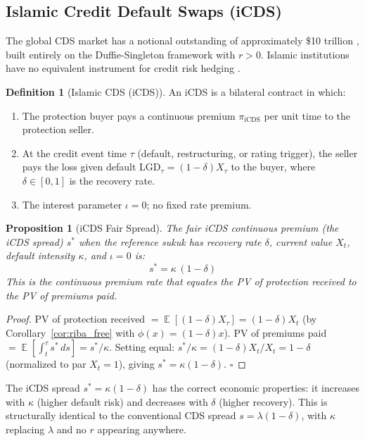 \documentclass[10pt,twocolumn]{article}
\theoremstyle{plain}
\newtheorem{proposition}{Proposition}
\theoremstyle{definition}
\newtheorem{definition}{Definition}
\DeclareMathOperator{\E}{\mathbb{E}}
\begin{document}
\subsection{Islamic Credit Default Swaps (iCDS)}
\label{sec:icds}

The global CDS market has a notional outstanding of approximately
\$10 trillion \cite{BIS2024}, built entirely on the Duffie-Singleton
framework with $r > 0$. Islamic institutions have no equivalent
instrument for credit risk hedging \cite{KhanAhmed2001}.

\begin{definition}[Islamic CDS (iCDS)]
An iCDS is a bilateral contract in which:
\begin{enumerate}[leftmargin=*,noitemsep]
\item The protection buyer pays a continuous premium $\pi_{\mathrm{iCDS}}$
per unit time to the protection seller.
\item At the credit event time $\tau$ (default, restructuring,
or rating trigger), the seller pays the loss given default
$\mathrm{LGD}_\tau = (1-\delta) X_\tau$ to the buyer, where
$\delta \in [0,1]$ is the recovery rate.
\item The interest parameter $\iota = 0$; no fixed rate premium.
\end{enumerate}
\end{definition}

\begin{proposition}[iCDS Fair Spread]
\label{prop:icds}
The fair iCDS continuous premium (the \emph{iCDS spread}) $s^*$
when the reference sukuk has recovery rate $\delta$, current
value $X_t$, default intensity $\kappa$, and $\iota = 0$ is:
\begin{equation}
s^* = \kappa\,(1-\delta)
\label{eq:icds_spread}
\end{equation}
This is the continuous premium rate that equates the PV of
protection received to the PV of premiums paid.
\end{proposition}

\begin{proof}
PV of protection received $= \E[(1-\delta)X_\tau] = (1-\delta)X_t$
(by Corollary~\ref{cor:riba_free} with $\phi(x) = (1-\delta)x$).
PV of premiums paid $= \E[\int_t^\tau s^*\,ds] = s^*/\kappa$.
Setting equal: $s^*/\kappa = (1-\delta)X_t/X_t = 1-\delta$
(normalized to par $X_t=1$), giving $s^* = \kappa(1-\delta)$.
\qquad$\square$
\end{proof}

The iCDS spread $s^* = \kappa(1-\delta)$ has the correct
economic properties: it increases with $\kappa$ (higher default
risk) and decreases with $\delta$ (higher recovery). This
is structurally identical to the conventional CDS spread
$s = \lambda(1-\delta)$, with $\kappa$ replacing $\lambda$
and no $r$ appearing anywhere.
\end{document}
